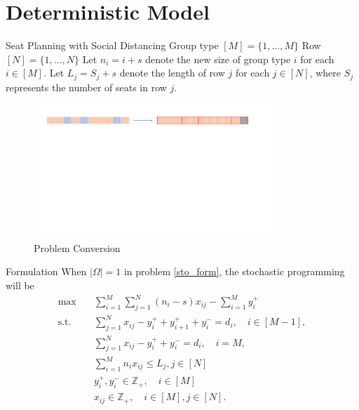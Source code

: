 
\section{Deterministic Model}
    \frame{\sectionpage}

    \begin{frame}{Seat Planning with Social Distancing}
      Group type $[M] = \{1, \ldots, M\}$
      Row $[N] = \{1, \ldots, N\}$
      Let $n_i = i + s$ denote the new size of group type $i$ for each $i \in [M]$.
      Let $L_j = S_j + s$ denote the length of row $j$ for each $j \in [N]$, where $S_j$ represents the number of seats in row $j$.
      \begin{figure}[ht]
        \centering
        \includegraphics[width = 0.8\textwidth]{./images/dummy_seat.pdf}
        \caption{Problem Conversion}
    \end{figure}

    \end{frame}

    \begin{frame}{Formulation}
      When $|\Omega| =1$ in problem \eqref{sto_form}, the stochastic programming will be 
      \small
      \begin{equation}\label{one_form}
        \begin{aligned}
        \max \quad & \sum_{i=1}^{M}  \sum_{j= 1}^{N} (n_i-s) x_{ij} - \sum_{i=1}^{M} y_{i}^{+}  \\
        \text {s.t.} \quad & \sum_{j= 1}^{N} x_{ij} - y_{i}^{+}+ y_{i+1}^{+} + y_{i}^{-} = d_{i}, \quad i \in [M-1], \\
        & \sum_{j= 1}^{N} x_{ij} -y_{i}^{+} + y_{i}^{-} = d_{i}, \quad i = M, \\
        & \sum_{i=1}^{M} n_{i} x_{ij} \leq L_j, j \in [N]\\
        & y_{i}^{+}, y_{i}^{-} \in \mathbb{Z}_{+}, \quad i \in [M] \\
        & x_{ij} \in \mathbb{Z}_{+}, \quad i \in [M], j \in [N].
        \end{aligned}
      \end{equation}
    \end{frame}

